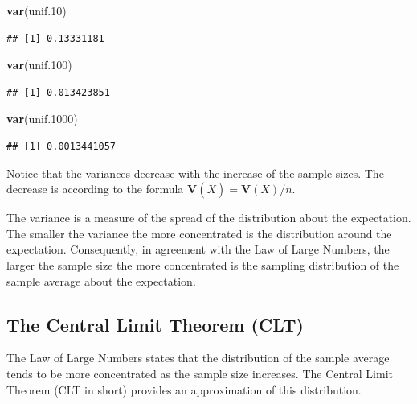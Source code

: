 \documentclass[]{krantz}
\makeatletter
\newenvironment{Shaded}{\begin{snugshade}}{\end{snugshade}}
\newcommand{\FloatTok}[1]{\textcolor[rgb]{0.00,0.00,0.81}{#1}}
\newcommand{\KeywordTok}[1]{\textcolor[rgb]{0.13,0.29,0.53}{\textbf{#1}}}
\newcommand{\NormalTok}[1]{#1}
\newcommand{\Var}{\mathbf{V}}
\newenvironment{kframe}{%
\medskip{}
\setlength{\fboxsep}{.8em}
 \def\at@end@of@kframe{}%
 \ifinner\ifhmode%
  \def\at@end@of@kframe{\end{minipage}}%
  \begin{minipage}{\columnwidth}%
 \fi\fi%
 \def\FrameCommand##1{\hskip\@totalleftmargin \hskip-\fboxsep
 \colorbox{shadecolor}{##1}\hskip-\fboxsep
     \hskip-\linewidth \hskip-\@totalleftmargin \hskip\columnwidth}%
 \MakeFramed {\advance\hsize-\width
   \@totalleftmargin\z@ \linewidth\hsize
   \@setminipage}}%
 {\par\unskip\endMakeFramed%
 \at@end@of@kframe}
\renewenvironment{Shaded}{\begin{kframe}}{\end{kframe}}
\theoremstyle{definition}
\theoremstyle{definition}
\theoremstyle{definition}
\theoremstyle{remark}
\makeatother
\begin{document}
\begin{Shaded}
\begin{Highlighting}[]
\KeywordTok{var}\NormalTok{(unif}\FloatTok{.10}\NormalTok{)}
\end{Highlighting}
\end{Shaded}

\begin{verbatim}
## [1] 0.13331181
\end{verbatim}

\begin{Shaded}
\begin{Highlighting}[]
\KeywordTok{var}\NormalTok{(unif}\FloatTok{.100}\NormalTok{)}
\end{Highlighting}
\end{Shaded}

\begin{verbatim}
## [1] 0.013423851
\end{verbatim}

\begin{Shaded}
\begin{Highlighting}[]
\KeywordTok{var}\NormalTok{(unif}\FloatTok{.1000}\NormalTok{)}
\end{Highlighting}
\end{Shaded}

\begin{verbatim}
## [1] 0.0013441057
\end{verbatim}

Notice that the variances decrease with the increase of the sample
sizes. The decrease is according to the formula
\(\Var(\bar X) = \Var(X)/n\).

The variance is a measure of the spread of the distribution about the
expectation. The smaller the variance the more concentrated is the
distribution around the expectation. Consequently, in agreement with the
Law of Large Numbers, the larger the sample size the more concentrated
is the sampling distribution of the sample average about the
expectation.

\hypertarget{the-central-limit-theorem-clt}{%
\subsection{The Central Limit Theorem (CLT)}\label{the-central-limit-theorem-clt}}

The Law of Large Numbers states that the distribution of the sample
average tends to be more concentrated as the sample size increases. The
Central Limit Theorem (CLT in short) provides an approximation of this
distribution.
\end{document}
